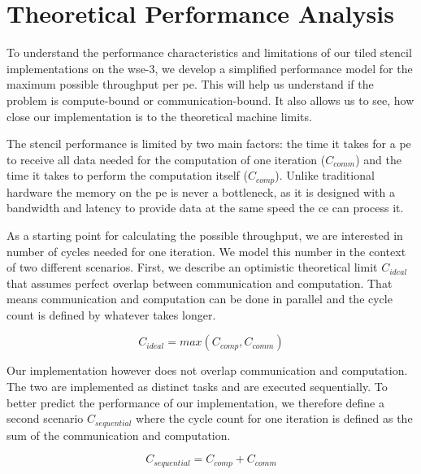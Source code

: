 \chapter{Theoretical Performance Analysis}
\label{sec:theory_performance}
To understand the performance characteristics and limitations of our tiled stencil implementations on the \ac{wse}-3, we develop a simplified performance model for the maximum possible throughput per \ac{pe}. This will help us understand if the problem is compute-bound or communication-bound. It also allows us to see, how close our implementation is to the theoretical machine limits.

The stencil performance is limited by two main factors: the time it takes for a \ac{pe} to receive all data needed for the computation of one iteration ($C_{comm}$) and the time it takes to perform the computation itself ($C_{comp}$). Unlike traditional hardware the memory on the \ac{pe} is never a bottleneck, as it is designed with a bandwidth and latency to provide data at the same speed the \ac{ce} can process it.

As a starting point for calculating the possible throughput, we are interested in number of cycles needed for one iteration. We model this number in the context of two different scenarios. First, we describe an optimistic theoretical limit $C_{ideal}$ that assumes perfect overlap between communication and computation. That means communication and computation can be done in parallel and the cycle count is defined by whatever takes longer.

\begin{equation}
    \label{eq:c_ideal}
    C_{ideal} = max\left(C_{comp}, C_{comm}\right)
\end{equation}


Our implementation however does not overlap communication and computation. The two are implemented as distinct tasks and are executed sequentially. To better predict the performance of our implementation, we therefore define a second scenario $C_{sequential}$ where the cycle count for one iteration is defined as the sum of the communication and computation.

\begin{equation}
    \label{eq:c_sequential}
    C_{sequential} = C_{comp} + C_{comm}
\end{equation}

